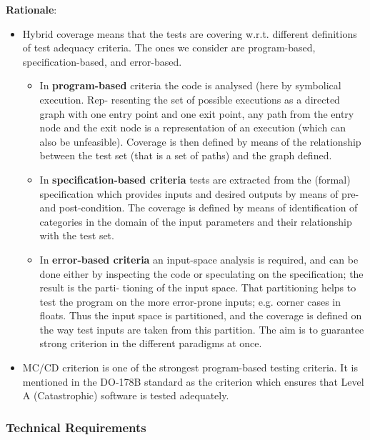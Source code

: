 \documentclass{article}
\newcommand{\tmstrong}[1]{\textbf{#1}}
\newenvironment{itemizedot}{\begin{itemize} \renewcommand{\labelitemi}{$\bullet$}\renewcommand{\labelitemii}{$\bullet$}\renewcommand{\labelitemiii}{$\bullet$}\renewcommand{\labelitemiv}{$\bullet$}}{\end{itemize}}
\begin{document}
{\tmstrong{Rationale}}:
\begin{itemizedot}
  \item Hybrid coverage means that the tests are covering w.r.t. different
  definitions of test adequacy criteria. The ones we consider are
  program-based, specification-based, and error-based.
  \begin{itemizedot}
    \item In {\tmstrong{program-based}} criteria the code is analysed (here by
    symbolical execution. Rep- resenting the set of possible executions as a
    directed graph with one entry point and one exit point, any path from the
    entry node and the exit node is a representation of an execution (which
    can also be unfeasible). Coverage is then defined by means of the
    relationship between the test set (that is a set of paths) and the graph
    defined.
    
    \item In {\tmstrong{specification-based criteria}} tests are extracted
    from the (formal) specification which provides inputs and desired outputs
    by means of pre- and post-condition. The coverage is defined by means of
    identification of categories in the domain of the input parameters and
    their relationship with the test set.
    
    \item In {\tmstrong{error-based criteria}} an input-space analysis is
    required, and can be done either by inspecting the code or speculating on
    the specification; the result is the parti- tioning of the input space.
    That partitioning helps to test the program on the more error-prone
    inputs; e.g. corner cases in floats. Thus the input space is partitioned,
    and the coverage is defined on the way test inputs are taken from this
    partition. The aim is to guarantee strong criterion in the different
    paradigms at once.
  \end{itemizedot}
  \item MC/CD criterion is one of the strongest program-based testing
  criteria. It is mentioned in the DO-178B standard as the criterion which
  ensures that Level A (Catastrophic) software is tested adequately.
\end{itemizedot}


\subsubsection{Technical Requirements}
\end{document}
